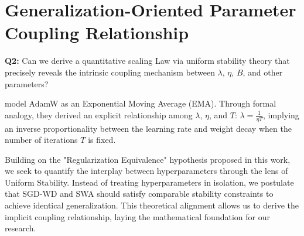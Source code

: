 \section{Generalization-Oriented Parameter Coupling Relationship}


\begin{tcolorbox}
\textbf{Q2:} Can we derive a quantitative scaling Law via uniform stability theory that precisely reveals the intrinsic coupling mechanism between $\lambda$, $\eta$, $B$, and other parameters?
\end{tcolorbox}

\citet{wang2025setadamwsweightdecay} model AdamW as an Exponential Moving Average (EMA). Through formal analogy, they derived an explicit relationship among $\lambda$, $\eta$, and $T$: $\lambda = \frac{1}{\eta T}$, implying an inverse proportionality between the learning rate and weight decay when the number of iterations $T$ is fixed. 

Building on the "Regularization Equivalence" hypothesis proposed in this work, we seek to quantify the interplay between hyperparameters through the lens of Uniform Stability. Instead of treating hyperparameters in isolation, we postulate that SGD-WD and SWA should satisfy comparable stability constraints to achieve identical generalization. This theoretical alignment allows us to derive the implicit coupling relationship, laying the mathematical foundation for our research.


